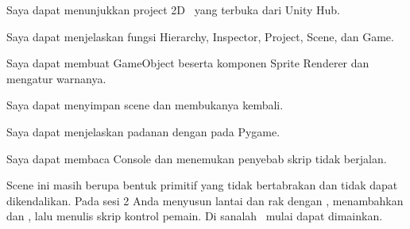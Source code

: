 
\begin{checklistbox}
\begin{checklist}
  \item Saya dapat menunjukkan project 2D \NamaProject\ yang terbuka dari
        Unity Hub.
  \item Saya dapat menjelaskan fungsi Hierarchy, Inspector, Project, Scene,
        dan Game.
  \item Saya dapat membuat GameObject beserta komponen Sprite Renderer dan
        mengatur warnanya.
  \item Saya dapat menyimpan scene dan membukanya kembali.
  \item Saya dapat menjelaskan padanan  dengan
         pada Pygame.
  \item Saya dapat membaca Console dan menemukan penyebab skrip tidak
        berjalan.
\end{checklist}
\end{checklistbox}


Scene ini masih berupa bentuk primitif yang tidak bertabrakan dan tidak dapat
dikendalikan. Pada sesi 2 Anda menyusun lantai dan rak dengan
, menambahkan  dan
, lalu menulis skrip kontrol pemain. Di sanalah
\NamaPermainan\ mulai dapat dimainkan.
